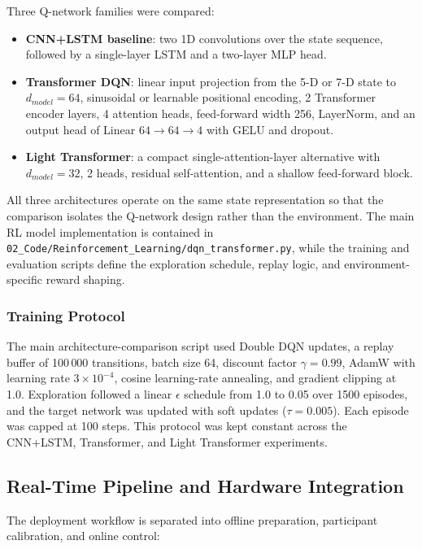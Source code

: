 \documentclass[12pt, a4paper]{article}
\begin{document}
Three Q-network families were compared:
\begin{itemize}
    \item \textbf{CNN+LSTM baseline}: two 1D convolutions over the state sequence, followed by a single-layer LSTM and a two-layer MLP head.
    \item \textbf{Transformer DQN}: linear input projection from the 5-D or 7-D state to $d_{model}=64$, sinusoidal or learnable positional encoding, 2 Transformer encoder layers, 4 attention heads, feed-forward width 256, LayerNorm, and an output head of Linear $64 \rightarrow 64 \rightarrow 4$ with GELU and dropout.
    \item \textbf{Light Transformer}: a compact single-attention-layer alternative with $d_{model}=32$, 2 heads, residual self-attention, and a shallow feed-forward block.
\end{itemize}
All three architectures operate on the same state representation so that the comparison isolates the Q-network design rather than the environment. The main RL model implementation is contained in \texttt{02\_Code/Reinforcement\_Learning/dqn\_transformer.py}, while the training and evaluation scripts define the exploration schedule, replay logic, and environment-specific reward shaping.

\subsubsection{Training Protocol}

The main architecture-comparison script used Double DQN updates, a replay buffer of 100\,000 transitions, batch size 64, discount factor $\gamma = 0.99$, AdamW with learning rate $3 \times 10^{-4}$, cosine learning-rate annealing, and gradient clipping at 1.0. Exploration followed a linear $\epsilon$ schedule from 1.0 to 0.05 over 1500 episodes, and the target network was updated with soft updates ($\tau = 0.005$). Each episode was capped at 100 steps. This protocol was kept constant across the CNN+LSTM, Transformer, and Light Transformer experiments.

\subsection{Real-Time Pipeline and Hardware Integration}

The deployment workflow is separated into offline preparation, participant calibration, and online control:
\end{document}
